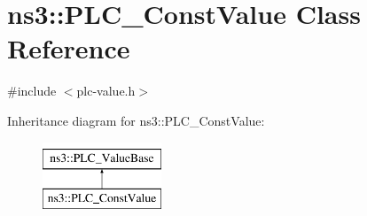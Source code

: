 \hypertarget{classns3_1_1PLC__ConstValue}{\section{ns3\-:\-:\-P\-L\-C\-\_\-\-Const\-Value \-Class \-Reference}
\label{classns3_1_1PLC__ConstValue}
}


{\ttfamily \#include $<$plc-\/value.\-h$>$}

\-Inheritance diagram for ns3\-:\-:\-P\-L\-C\-\_\-\-Const\-Value\-:\begin{figure}[H]
\begin{center}
\leavevmode
\includegraphics[height=2.000000cm]{classns3_1_1PLC__ConstValue}
\end{center}
\end{figure}
